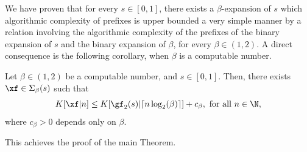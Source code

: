 
We have proven that for every $s \in [0,1]$, there exists a $\beta$-expansion of $s$ which algorithmic complexity of prefixes is upper bounded a very simple manner by a relation involving the algorithmic complexity of the prefixes of the binary expansion of $s$ and the binary expansion of $\beta$, for every $\beta \in (1,2)$. A direct consequence is the following corollary, when $\beta$ is a computable number.
\begin{corollary}
	Let $\beta \in (1,2)$ be a computable number, and $s \in [0,1]$. Then, there exists $\xf \in \Sigma_\beta(s)$ such that
	\begin{equation}\label{eq:computable algorithmic complexity of beta expansion lower than binary expansion}
		K[\xf|n] \leq  K[\gf_2(s)|\lceil n \log_2(\beta)\rceil] + c_\beta, \ \text{for all} \ n \in \N,
	\end{equation}
	where $c_\beta > 0$ depends only on $\beta$.
\end{corollary}
\noindent This achieves the proof of the main Theorem.
